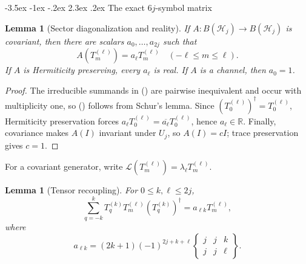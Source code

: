 \documentclass[twoside,10pt]{article}
\makeatletter
\numberwithin{equation}{section}
\theoremstyle{slbody}
\newtheorem{lemma}[theorem]{Lemma}
\theoremstyle{definition}
\theoremstyle{remark}
\newcommand{\cL}{\mathcal L}
\renewcommand{\section}{%
  \@startsection{section}{1}{\z@}%
    {-3.5ex \@plus -1ex \@minus -.2ex}%
    {2.3ex \@plus .2ex}%
    {\normalfont\large\bfseries}}
\renewcommand{\eqref}[1]{%
  \textup{{\normalfont(\oldstylenums{\ref{#1}}}\normalfont)}}
\makeatother
\begin{document}
\section{The exact \texorpdfstring{\(6j\)}{6j}-symbol matrix}

\begin{lemma}[Sector diagonalization and reality]
\label{lem:sector-diagonalization}
If \(A:B(\mathcal H_j)\to B(\mathcal H_j)\) is covariant, then there
are scalars \(a_0,\ldots,a_{2j}\) such that
\begin{equation}\label{eq:sector-diagonalization}
 A(T_m^{(\ell)})=a_\ell T_m^{(\ell)}
 \quad(-\ell\leq m\leq\ell).
\end{equation}
If \(A\) is Hermiticity preserving, every \(a_\ell\) is real.  If
\(A\) is a channel, then \(a_0=1\).
\end{lemma}

\begin{proof}
The irreducible summands in \eqref{eq:adjoint-decomposition} are
pairwise inequivalent and occur with multiplicity one, so
\eqref{eq:sector-diagonalization} follows from Schur's lemma.  Since
\((T_0^{(\ell)})^\dagger=T_0^{(\ell)}\), Hermiticity preservation
forces
\(a_\ell T_0^{(\ell)}=\overline{a_\ell}T_0^{(\ell)}\), hence
\(a_\ell\in\mathbb R\).  Finally, covariance makes \(A(I)\) invariant
under \(U_j\), so \(A(I)=cI\); trace preservation gives \(c=1\).
\end{proof}

For a covariant generator, write
\(\cL(T_m^{(\ell)})=\lambda_\ell T_m^{(\ell)}\).

\begin{lemma}[Tensor recoupling]\label{lem:tensor-recoupling}
For \(0\leq k,\ell\leq2j\),
\begin{equation}\label{eq:kraus-recoupling}
 \sum_{q=-k}^kT_q^{(k)}T_m^{(\ell)}(T_q^{(k)})^\dagger
 =a_{\ell k}T_m^{(\ell)},
\end{equation}
where
\begin{equation}\label{eq:a-lk}
 a_{\ell k}=(2k+1)(-1)^{2j+k+\ell}
 \begin{Bmatrix}
 j&j&k\\ j&j&\ell
 \end{Bmatrix}.
\end{equation}
\end{lemma}
\end{document}
